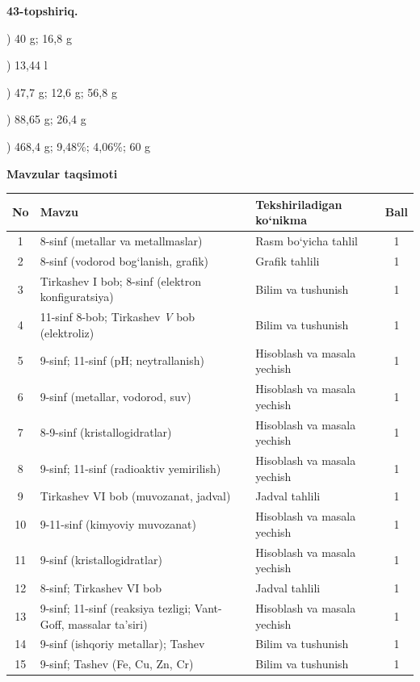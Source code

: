 \documentclass[11pt,a4paper]{article}
\begin{document}
\noindent\textbf{43-topshiriq.}\par
{}) 40 g; 16,8 g\par
{}) 13,44 l\par
{}) 47,7 g; 12,6 g; 56,8 g\par
{}) 88,65 g; 26,4 g\par
{}) 468,4 g; 9,48\%; 4,06\%; 60 g\par
\par\bigskip\noindent\textbf{Mavzular taqsimoti}\par\smallskip
{\small\noindent\begin{longtable}{|c|p{7.2cm}|p{5.4cm}|c|}\hline \textbf{No} & \textbf{Mavzu} & \textbf{Tekshiriladigan ko`nikma} & \textbf{Ball}\\\hline
1 & 8-sinf (metallar va metallmaslar) & Rasm bo`yicha tahlil & 1\\\hline
2 & 8-sinf (vodorod bog`lanish, grafik) & Grafik tahlili & 1\\\hline
3 & Tirkashev I bob; 8-sinf (elektron konfiguratsiya) & Bilim va tushunish & 1\\\hline
4 & 11-sinf 8-bob; Tirkashev \textit{V} bob (elektroliz) & Bilim va tushunish & 1\\\hline
5 & 9-sinf; 11-sinf (pH; neytrallanish) & Hisoblash va masala yechish & 1\\\hline
6 & 9-sinf (metallar, vodorod, suv) & Hisoblash va masala yechish & 1\\\hline
7 & 8-9-sinf (kristallogidratlar) & Hisoblash va masala yechish & 1\\\hline
8 & 9-sinf; 11-sinf (radioaktiv yemirilish) & Hisoblash va masala yechish & 1\\\hline
9 & Tirkashev VI bob (muvozanat, jadval) & Jadval tahlili & 1\\\hline
10 & 9-11-sinf (kimyoviy muvozanat) & Hisoblash va masala yechish & 1\\\hline
11 & 9-sinf (kristallogidratlar) & Hisoblash va masala yechish & 1\\\hline
12 & 8-sinf; Tirkashev VI bob & Jadval tahlili & 1\\\hline
13 & 9-sinf; 11-sinf (reaksiya tezligi; Vant-Goff, massalar ta'siri) & Hisoblash va masala yechish & 1\\\hline
14 & 9-sinf (ishqoriy metallar); Tashev & Bilim va tushunish & 1\\\hline
15 & 9-sinf; Tashev (Fe, Cu, Zn, Cr) & Bilim va tushunish & 1\\\hline

\end{longtable}}
\end{document}
